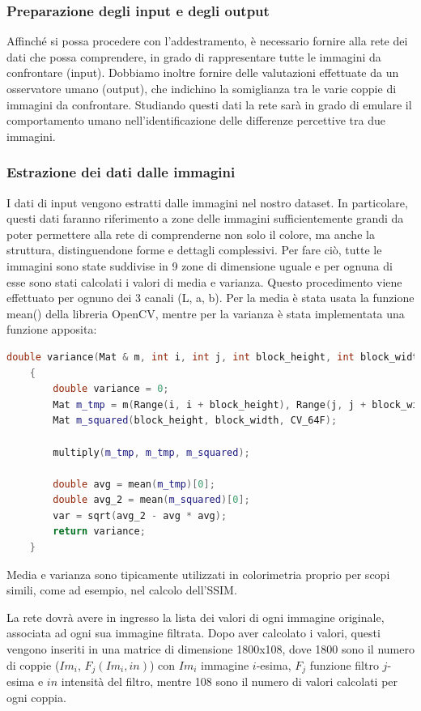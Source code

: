 \documentclass[a4paper,11pt]{article}
\begin{document}
    \subsubsection{Preparazione degli input e degli output}
    Affinché si possa procedere con l'addestramento, è necessario fornire alla rete dei dati che possa comprendere, in grado di rappresentare
    tutte le immagini da confrontare (input). Dobbiamo inoltre fornire delle valutazioni effettuate da un osservatore umano (output), che indichino la somiglianza tra le varie coppie di immagini da confrontare. 
    Studiando questi dati la rete sarà in grado di emulare il comportamento umano nell'identificazione delle differenze percettive tra due immagini.

    \subsubsection{Estrazione dei dati dalle immagini}
    I dati di input vengono estratti dalle immagini nel nostro dataset. In particolare, questi dati faranno riferimento a zone delle immagini sufficientemente grandi da poter permettere alla rete di comprenderne
    non solo il colore, ma anche la struttura, distinguendone forme e dettagli complessivi. Per fare ciò, tutte le immagini sono
    state suddivise in 9 zone di dimensione uguale e per ognuna di esse sono stati calcolati i valori di media e varianza. Questo procedimento
    viene effettuato per ognuno dei 3 canali (L, a, b).
    Per la media è stata usata la funzione mean() della libreria OpenCV, mentre per la varianza è stata implementata una funzione apposita: 
    \begin{lstlisting}[language=C++]
    double variance(Mat & m, int i, int j, int block_height, int block_width)
    {
        double variance = 0;
        Mat m_tmp = m(Range(i, i + block_height), Range(j, j + block_width)); 
        Mat m_squared(block_height, block_width, CV_64F); 
        
        multiply(m_tmp, m_tmp, m_squared);
        
        double avg = mean(m_tmp)[0]; 	
        double avg_2 = mean(m_squared)[0]; 	
        var = sqrt(avg_2 - avg * avg);
        return variance;
    }
    \end{lstlisting}
    Media e varianza sono tipicamente utilizzati in colorimetria proprio per scopi simili, come ad esempio, nel calcolo dell'SSIM.

    La rete dovrà avere in ingresso la lista dei valori di ogni immagine originale, associata ad ogni sua immagine filtrata. 
    Dopo aver calcolato i valori, questi vengono inseriti in una matrice di dimensione 1800x108, dove 1800 sono il numero di coppie ($Im_i$, $F_j(Im_i, in)$)
    con $Im_i$ immagine $i$-esima, $F_j$ funzione filtro $j$-esima e $in$ intensità del filtro, mentre 108 sono il numero di valori calcolati per ogni coppia.
    
\end{document}
